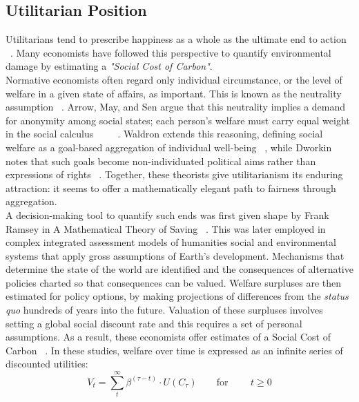 \documentclass[10pt, oneside]{article}   	%
\begin{document}
\subsection{Utilitarian Position}

Utilitarians tend to prescribe happiness as a whole as the ultimate end to action ~\cite{hs1}.
Many economists have followed this perspective to quantify environmental damage by estimating a \emph{"Social Cost of Carbon"}.\\

Normative economists often regard only individual circumstance, or the level of welfare in a given state of affairs, as important.
This is known as the neutrality assumption ~\cite{pd2}.
Arrow, May, and Sen argue that this neutrality implies a demand for anonymity among social states; each person’s welfare must carry equal weight in the social calculus ~\cite{ka1} ~\cite{km1} ~\cite{as2}.
Waldron extends this reasoning, defining social welfare as a goal-based aggregation of individual well-being ~\cite{jw2}, while Dworkin notes that such goals become non-individuated political aims rather than expressions of rights ~\cite{rd1}.
Together, these theorists give utilitarianism its enduring attraction: it seems to offer a mathematically elegant path to fairness through aggregation.\\

A decision-making tool to quantify such ends was first given shape by Frank Ramsey in A Mathematical Theory of Saving ~\cite{fr1}.
This was later employed in complex integrated assessment models of humanities social and environmental systems that apply gross assumptions of Earth's development.
Mechanisms that determine the state of the world are identified and the consequences of alternative policies charted so that consequences can be valued.
Welfare surpluses are then estimated for policy options, by making projections of differences from the \emph{status quo} hundreds of years into the future.
Valuation of these surpluses involves setting a global social discount rate and this requires a set of personal assumptions.
As a result, these economists offer estimates of a Social Cost of Carbon ~\cite{pd2}.
In these studies, welfare over time is expressed as an infinite series of discounted utilities:\\

\begin{equation}
V_t = \sum_t^\infty \beta^{(\tau - t)} \cdot U (C_\tau)
\qquad \text{for }
\qquad t \geq 0
\end{equation}\\
\end{document}
